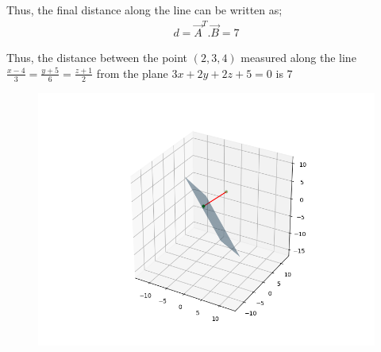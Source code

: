 \documentclass{beamer}
\providecommand{\brak}[1]{\ensuremath{\left(#1\right)}}
\theoremstyle{remark}
\numberwithin{equation}{section}
\begin{document}
\begin{frame}
Thus, the final distance along the line can be written as;
\begin{align}
d=\Vec{A}^T.\Vec{B}=7
\end{align}

Thus, the distance between the point $\brak{2,3,4}$ measured along the line $\frac{x-4}{3}=\frac{y+5}{6}=\frac{z+1}{2}$ from the plane $3x+2y+2z+5=0$ is $7$

\begin{figure}[H]
\centering
\includegraphics[width=0.6\columnwidth]{figs/img.png}
\caption*{}
\end{figure}
\end{frame}
\end{document}
